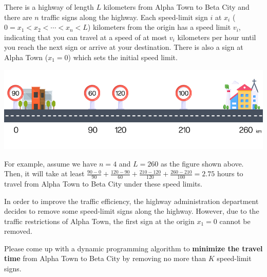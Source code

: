 
There is a highway of length $L$ kilometers from Alpha Town to Beta City and there are $n$ traffic signs along the highway. Each speed-limit sign $i$ at $x_i$ ($0=x_1<x_2<\cdots<x_n<L$) kilometers from the origin has a speed limit $v_i$, indicating that you can travel at a speed of at most $v_i$ kilometers per hour until you reach the next sign or arrive at your destination. There is also a sign at Alpha Town ($x_1=0$) which sets the initial speed limit.

\begin{center}
	\includegraphics[width = \linewidth]{img/highway.png}
\end{center}

For example, assume we have $n=4$ and $L=260$ as the figure shown above. Then, it will take at least $\frac{90-0}{90}+\frac{120-90}{60}+\frac{210-120}{120}+\frac{260-210}{100}=2.75$ hours to travel from Alpha Town to Beta City under these speed limits.

In order to improve the traffic efficiency, the highway administration department decides to remove some speed-limit signs along the highway. However, due to the traffic restrictions of Alpha Town, the first sign at the origin $x_1=0$ cannot be removed.

Please come up with a dynamic programming algorithm to \textbf{minimize the travel time} from Alpha Town to Beta City by removing no more than $K$ speed-limit signs.

\vspace{0.2in}

